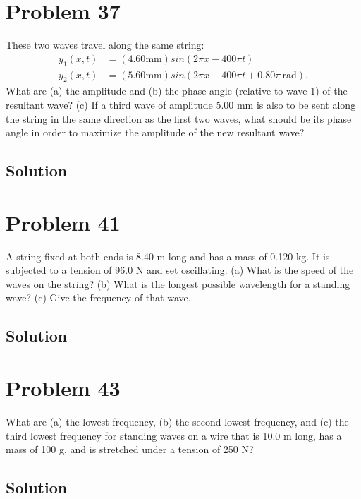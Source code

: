 \documentclass[12pt]{article}
\begin{document}
    \section{Problem 37}
        These two waves travel along the same string:
        \begin{align}
            y_1(x, t)   &=  (4.60 \unit{\milli\meter}) sin(2\pi x - 400\pi t)\\
            y_2(x, t)   &=  (5.60 \unit{\milli\meter}) sin(2\pi x - 400\pi t + 0.80\pi\,\unit{\radian}).
        \end{align}
        What are (a) the amplitude and (b) the phase angle (relative to wave 1) of the resultant wave? 
        (c) If a third wave of amplitude 5.00 mm is also to be sent along the string in the same direction as the first two waves, what should be its phase angle in order to maximize the amplitude of the new resultant wave?

        \subsection{Solution}

    \section{Problem 41}
        A string fixed at both ends is 8.40 m long and has a mass of 0.120 kg. 
        It is subjected to a tension of 96.0 N and set oscillating. 
        (a) What is the speed of the waves on the string? 
        (b) What is the longest possible wavelength for a standing wave? 
        (c) Give the frequency of that wave.

        \subsection{Solution}

    \section{Problem 43}
        What are (a) the lowest frequency, (b) the second lowest frequency, and (c) the third lowest frequency for standing waves on a wire that is 10.0 m long, has a mass of 100 g, and is stretched under a tension of 250 N?

        \subsection{Solution}
\end{document}
